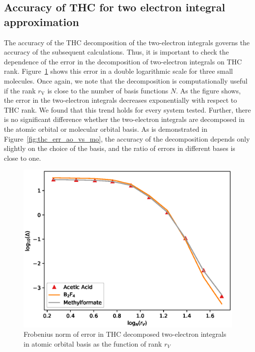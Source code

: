 \subsection{Accuracy of THC for two electron integral approximation}
The accuracy of the THC decomposition of the two-electron integrals governs the
accuracy of the subsequent calculations. Thus, it is important to 
check the dependence of the error in the decomposition of
two-electron integrals on THC rank. Figure~\ref{fig:thc_err_mo_3systems} 
shows this error in a double logarithmic scale for three small molecules. 
Once again, we note that the decomposition is computationally useful if the 
rank $r_\mathrm{V}$ is close to the number of basis functions $N$.  As the 
figure shows, the error in the two-electron integrals decreases exponentially 
with respect to THC rank. We found that this trend holds for every system
tested. Further, there is no significant difference whether the two-electron 
integrals are decomposed in the atomic orbital or molecular orbital basis. As 
is demonstrated in Figure~\ref{fig:thc_err_ao_vs_mo}, the accuracy of the 
decomposition depends only slightly on the choice of the basis, and the ratio 
of errors in different bases is close to one.
%
\begin{figure}[tb]
\includegraphics[width=\columnwidth]{figures/thc_rccsd/thc_err_mo_3systems}
\caption{Frobenius norm of error in THC decomposed two-electron integrals in 
atomic orbital basis as the function of rank $r_{V}$
\label{fig:thc_err_mo_3systems}}
\end{figure}
%
